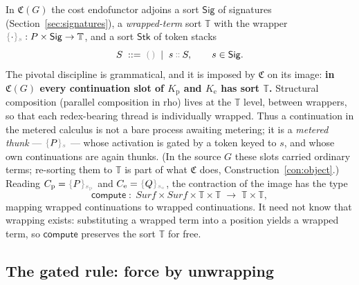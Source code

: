 \documentclass[11pt]{article}
\theoremstyle{definition}
\theoremstyle{plain}
\newcommand{\dec}[1]{\textcolor{costgray}{#1}}   %
\newcommand{\Sig}{\mathsf{Sig}}
\newcommand{\Tok}{\mathsf{Stk}}
\newcommand{\WT}{\mathbb{T}}                  %
\newcommand{\Cost}{\mathfrak{C}}              %
\newcommand{\sgn}[2]{\dec{\{}{#1}\dec{\}_{#2}}}  %
\newcommand{\cons}{\mathbin{\dec{\dblcolon}}}  %
\newcommand{\nil}{\dec{(\,)}}                  %
\newcommand{\compute}{\mathsf{compute}}
\newcommand{\Kp}{K_{\mathrm{p}}}
\newcommand{\Ke}{K_{\mathrm{e}}}
\begin{document}
In $\Cost(G)$ the cost endofunctor adjoins a sort $\Sig$ of signatures
(Section~\ref{sec:signatures}), a \emph{wrapped-term} sort $\WT$ with the
wrapper $\sgn{\cdot}{s} : P \times \Sig \to \WT$, and a sort $\Tok$ of
token stacks
%
\begin{equation}
  S \;::=\; \nil \;\mid\; s \cons S, \qquad s \in \Sig .
  \label{eq:stack}
\end{equation}
%
The pivotal discipline is grammatical, and it is imposed by $\Cost$ on
its image: \textbf{in $\Cost(G)$ every continuation slot of $\Kp$ and
$\Ke$ has sort $\WT$.} Structural composition (parallel composition in
rho) lives at the $\WT$ level, between wrappers, so that each
redex-bearing thread is individually wrapped. Thus a continuation in the
metered calculus is not a bare process awaiting metering; it is a
\emph{metered thunk} --- $\sgn{P}{s}$ --- whose activation is gated by a
token keyed to $s$, and whose own continuations are again thunks. (In
the source $G$ these slots carried ordinary terms; re-sorting them to
$\WT$ is part of what $\Cost$ does, Construction~\ref{con:object}.)
Reading $C_{\mathrm p} = \sgn{P}{s_{\mathrm p}}$ and
$C_{\mathrm e} = \sgn{Q}{s_{\mathrm e}}$, the contraction of the image has
the type
%
\[
  \compute \;:\; \mathit{Surf}\times\mathit{Surf}\times\WT\times\WT
            \;\longrightarrow\; \WT\times\WT,
\]
%
mapping wrapped continuations to wrapped continuations. It need not know
that wrapping exists: substituting a wrapped term into a position yields a
wrapped term, so $\compute$ preserves the sort $\WT$ for free.

\subsection{The gated rule: force by unwrapping}
\end{document}
